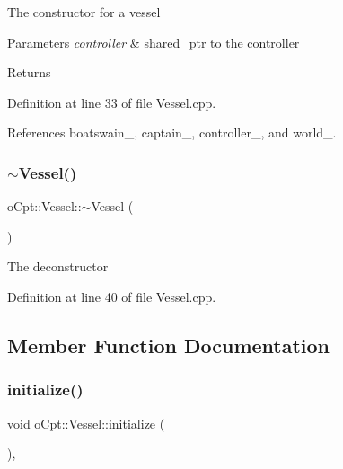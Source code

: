 The constructor for a vessel 
\begin{DoxyParams}{Parameters}
{\em controller} & shared\+\_\+ptr to the controller \\
\hline
\end{DoxyParams}
\begin{DoxyReturn}{Returns}

\end{DoxyReturn}


Definition at line 33 of file Vessel.\+cpp.



References boatswain\+\_\+, captain\+\_\+, controller\+\_\+, and world\+\_\+.

\hypertarget{classo_cpt_1_1_vessel_ac48b6cdeb7449a1523d8398dfcff0b37}{}\label{classo_cpt_1_1_vessel_ac48b6cdeb7449a1523d8398dfcff0b37} 
\subsubsection{\texorpdfstring{$\sim$\+Vessel()}{~Vessel()}}
{\footnotesize\ttfamily o\+Cpt\+::\+Vessel\+::$\sim$\+Vessel (\begin{DoxyParamCaption}{ }\end{DoxyParamCaption})\hspace{0.3cm}{\ttfamily [virtual]}}

The deconstructor 

Definition at line 40 of file Vessel.\+cpp.



\subsection{Member Function Documentation}
\hypertarget{classo_cpt_1_1_vessel_a64af8c6be9c915b76f37cff6abc5be36}{}\label{classo_cpt_1_1_vessel_a64af8c6be9c915b76f37cff6abc5be36} 
\subsubsection{\texorpdfstring{initialize()}{initialize()}}
{\footnotesize\ttfamily void o\+Cpt\+::\+Vessel\+::initialize (\begin{DoxyParamCaption}{ }\end{DoxyParamCaption})\hspace{0.3cm}{\ttfamily [override]}, {\ttfamily [virtual]}}

